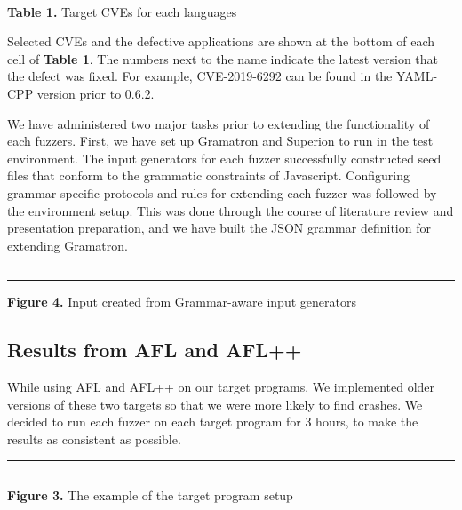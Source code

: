 \documentclass[12pt]{diazessay}
\begin{document}
\begin{table}[h!]
{\begin{tabular}{V{4}l|l|lV{4}}
\end{tabular}
}
\vspace{6mm}\\ \textbf{Table 1.} Target CVEs for each languages
\end{table}
\vspace{6mm}

Selected CVEs and the defective applications are shown at the bottom of each cell of \textbf{Table 1}. The numbers next to the name indicate the latest version that the defect was fixed. For example, CVE-2019-6292 can be found in the YAML-CPP version prior to 0.6.2.


We have administered two major tasks prior to extending the functionality of each fuzzers.
First, we have set up Gramatron and Superion to run in the test environment.
The input generators for each fuzzer successfully constructed seed files \cite{superion-example}\cite{gramatron-example}that conform to the grammatic constraints of Javascript.
Configuring grammar-specific protocols and rules for extending each fuzzer was followed by the environment setup.
This was done through the course of literature review and presentation preparation, and we have built the JSON grammar definition\cite{json-source.json} for extending Gramatron.

\vspace{22mm}
\hrule height 0.4mm
\begingroup \fontsize{12pt}{12pt} \selectfont \begin{alltt}

\end{alltt} \vspace{-6mm} \endgroup \hrule height 0.4mm
\vspace{6mm}
\centerline{\textbf{Figure 4.} Input created from Grammar-aware input generators}
\vspace{6mm}



\subsection*{Results from AFL and AFL++}
While using AFL and AFL++ on our target programs. We implemented older versions of these two targets so that we were more likely to find crashes. We decided to run each fuzzer on each target program for 3 hours, to make the results as consistent as possible.
\vspace{22mm}
\hrule height 0.4mm
\begingroup \fontsize{12pt}{12pt} \selectfont \begin{alltt}

\end{alltt} \vspace{-6mm} \endgroup \hrule height 0.4mm
\vspace{6mm}
\centerline{\textbf{Figure 3.} The example of the target program setup}
\vspace{6mm}
\end{document}
